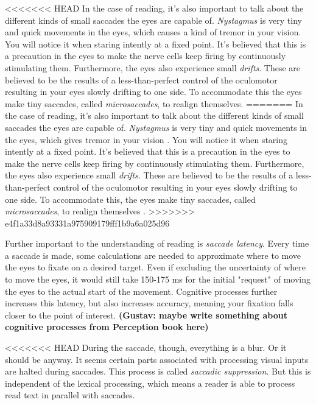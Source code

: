 <<<<<<< HEAD
In the case of reading, it's also important to talk about the different kinds of small saccades the eyes are capable of. \textit{Nystagmus} is very tiny and quick movements in the eyes, which causes a kind of tremor in your vision. You will notice it when staring intently at a fixed point. It's believed that this is a precaution in the eyes to make the nerve cells keep firing by continuously stimulating them. Furthermore, the eyes also experience small \textit{drifts}. These are believed to be the results of a less-than-perfect control of the oculomotor resulting in your eyes slowly drifting to one side. To accommodate this the eyes make tiny saccades, called \textit{microsaccades}, to realign themselves.
=======
In the case of reading, it's also important to talk about the different kinds of small saccades the eyes are capable of. \textit{Nystagmus} is very tiny and quick movements in the eyes, which gives tremor in your vision \cite{KILDE MATHIAS}. You will notice it when staring intently at a fixed point. It's believed that this is a precaution in the eyes to make the nerve cells keep firing by continuously stimulating them. Furthermore, the eyes also experience small \textit{drifts}. These are believed to be the results of a less-than-perfect control of the oculomotor resulting in your eyes slowly drifting to one side. To accommodate this, the eyes make tiny saccades, called \textit{microsaccades}, to realign themselves \cite{KILDE MATHIAS}.
>>>>>>> e4f1a33d8a93331a975909179fff1b9a6a025d96

Further important to the understanding of reading is \textit{saccade latency}. Every time a saccade is made, some calculations are needed to approximate where to move the eyes to fixate on a desired target. Even if excluding the uncertainty of where to move the eyes, it would still take 150-175 ms for the initial "request" of moving the eyes to the actual start of the movement. Cognitive processes further increases this latency, but also increases accuracy, meaning your fixation falls closer to the point of interest.
\textbf{
(Gustav: maybe write something about cognitive processes from Perception book here)}

<<<<<<< HEAD
During the saccade, though, everything is a blur. Or it should be anyway. It seems certain parts associated with processing visual inputs are halted during saccades. This process is called \textit{saccadic suppression}. But this is independent of the lexical processing, which means a reader is able to process read text in parallel with saccades.

